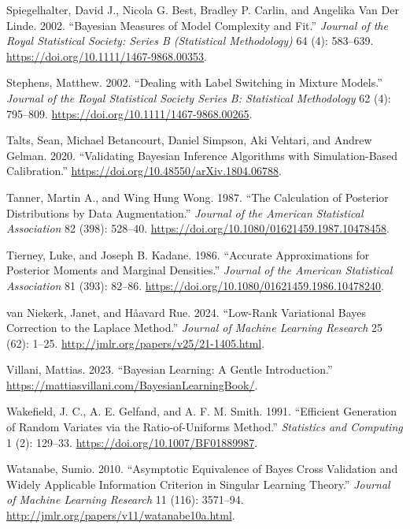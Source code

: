 \documentclass[
  11pt,
  letterpaper,
]{scrbook}
\newlength{\cslhangindent}
\newenvironment{CSLReferences}[2] %
 {\begin{list}{}{%
  \setlength{\itemindent}{0pt}
  \setlength{\leftmargin}{0pt}
  \setlength{\parsep}{0pt}
  \ifodd #1
   \setlength{\leftmargin}{\cslhangindent}
   \setlength{\itemindent}{-1\cslhangindent}
  \fi
  \setlength{\itemsep}{#2\baselineskip}}}
 {\end{list}}
\theoremstyle{plain}
\theoremstyle{definition}
\theoremstyle{definition}
\theoremstyle{plain}
\theoremstyle{plain}
\theoremstyle{definition}
\theoremstyle{remark}
\begin{document}
\begin{CSLReferences}{1}{0}
Spiegelhalter, David J., Nicola G. Best, Bradley P. Carlin, and Angelika
Van Der Linde. 2002. {``Bayesian Measures of Model Complexity and
Fit.''} \emph{Journal of the Royal Statistical Society: Series B
(Statistical Methodology)} 64 (4): 583--639.
\url{https://doi.org/10.1111/1467-9868.00353}.

Stephens, Matthew. 2002. {``Dealing with Label Switching in Mixture
Models.''} \emph{Journal of the Royal Statistical Society Series B:
Statistical Methodology} 62 (4): 795--809.
\url{https://doi.org/10.1111/1467-9868.00265}.

Talts, Sean, Michael Betancourt, Daniel Simpson, Aki Vehtari, and Andrew
Gelman. 2020. {``Validating {B}ayesian Inference Algorithms with
Simulation-Based Calibration.''}
\url{https://doi.org/10.48550/arXiv.1804.06788}.

Tanner, Martin A., and Wing Hung Wong. 1987. {``The Calculation of
Posterior Distributions by Data Augmentation.''} \emph{Journal of the
American Statistical Association} 82 (398): 528--40.
\url{https://doi.org/10.1080/01621459.1987.10478458}.

Tierney, Luke, and Joseph B. Kadane. 1986. {``Accurate Approximations
for Posterior Moments and Marginal Densities.''} \emph{Journal of the
American Statistical Association} 81 (393): 82--86.
\url{https://doi.org/10.1080/01621459.1986.10478240}.

van Niekerk, Janet, and Håavard Rue. 2024. {``Low-Rank Variational
{B}ayes Correction to the {L}aplace Method.''} \emph{Journal of Machine
Learning Research} 25 (62): 1--25.
\url{http://jmlr.org/papers/v25/21-1405.html}.

Villani, Mattias. 2023. {``Bayesian Learning: A Gentle Introduction.''}
\url{https://mattiasvillani.com/BayesianLearningBook/}.

Wakefield, J. C., A. E. Gelfand, and A. F. M. Smith. 1991. {``Efficient
Generation of Random Variates via the Ratio-of-Uniforms Method.''}
\emph{Statistics and Computing} 1 (2): 129--33.
\url{https://doi.org/10.1007/BF01889987}.

Watanabe, Sumio. 2010. {``Asymptotic Equivalence of {B}ayes Cross
Validation and Widely Applicable Information Criterion in Singular
Learning Theory.''} \emph{Journal of Machine Learning Research} 11
(116): 3571--94. \url{http://jmlr.org/papers/v11/watanabe10a.html}.


\end{CSLReferences}
\end{document}
